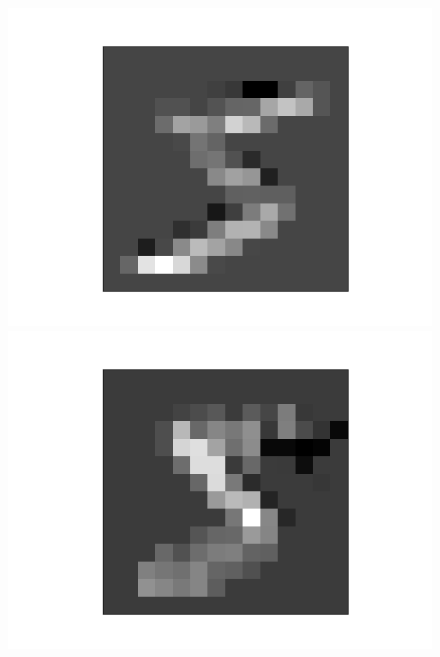 \documentclass{article}
\begin{document}
\begin{figure}[h]
\begin{minipage}{0.2\linewidth}
	\includegraphics[width=\linewidth]{../graphics/mnist_5/conv_pool/upper_horiz_pooled.png}
\end{minipage}
\hfill
\begin{minipage}{0.2\linewidth}
	\centering
	\includegraphics[width=\linewidth]{../graphics/mnist_5/conv_pool/left_vert_pooled.png}
\end{minipage}
\hfill
\begin{minipage}{0.2\linewidth}
	\centering

\end{minipage}
\end{figure}
\end{document}

